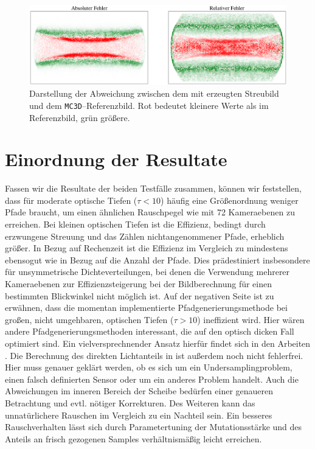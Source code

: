 		\begin{figure}
			\centering
			\includegraphics[width=1.0\textwidth]{resdiskplot.eps}
			\caption{Darstellung der Abweichung zwischen dem mit \pirate erzeugten Streubild und dem \texttt{MC3D}--Referenzbild. Rot bedeutet kleinere Werte als im Referenzbild, grün größere.}
			\label{fig:resdiskplot}
		\end{figure}
	

	\section{Einordnung der Resultate}
	Fassen wir die Resultate der beiden Testfälle zusammen, können wir feststellen, dass \pirate für moderate optische Tiefen ($\tau < 10$) häufig eine Größenordnung weniger Pfade braucht, um einen ähnlichen Rauschpegel wie \mctd mit 72 Kameraebenen zu erreichen. Bei kleinen optischen Tiefen ist die Effizienz, bedingt durch erzwungene Streuung und das Zählen nichtangenommener Pfade, erheblich größer. In Bezug auf Rechenzeit ist die Effizienz im Vergleich zu \mctd mindestens ebensogut wie in Bezug auf die Anzahl der Pfade. Dies prädestiniert \pirate insbesondere für unsymmetrische Dichteverteilungen, bei denen die Verwendung mehrerer Kameraebenen zur Effizienzsteigerung bei der Bildberechnung für einen bestimmten Blickwinkel nicht möglich ist. Auf der negativen Seite ist zu erwähnen, dass die momentan implementierte Pfadgenerierungsmethode bei großen, nicht umgehbaren, optischen Tiefen ($\tau>10$) ineffizient wird. Hier wären andere Pfadgenerierungsmethoden interessant, die auf den optisch dicken Fall optimiert sind. Ein vielversprechnender Ansatz  hierfür findet sich in den Arbeiten \citep{Laszlo:2005p11056,DAldous:1994p11528,Grassberger:2002p10876}. Die Berechnung des direkten Lichtanteils in \pirate ist außerdem noch nicht fehlerfrei. Hier muss genauer geklärt werden, ob es sich um ein Undersamplingproblem, einen falsch definierten Sensor oder um ein anderes Problem handelt. Auch die Abweichungen im inneren Bereich der Scheibe bedürfen einer genaueren Betrachtung und evtl. nötiger Korrekturen. Des Weiteren kann das unnatürlichere Rauschen im Vergleich zu \mctd ein Nachteil sein. Ein besseres Rauschverhalten lässt sich durch Parametertuning der Mutationsstärke und des Anteils an frisch gezogenen Samples verhältnismäßig leicht erreichen.
	
